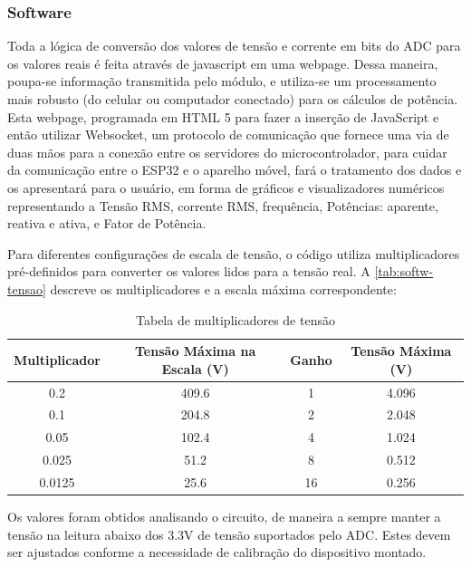 \subsubsection{Software}\label{softwa}

Toda a lógica de conversão dos valores de tensão e corrente em bits do \gls{ADC} para os valores reais é feita através de javascript em uma webpage. Dessa maneira, poupa-se informação transmitida pelo módulo, e utiliza-se um processamento mais robusto (do celular ou computador conectado) para os cálculos de potência.
Esta webpage, programada em HTML 5 para fazer a inserção de JavaScript e então utilizar Websocket, um protocolo de comunicação que fornece uma via de duas mãos para a conexão entre os servidores do microcontrolador, para cuidar da comunicação entre o ESP32 e o aparelho móvel, fará o tratamento dos dados e os apresentará para o usuário, em forma de gráficos e visualizadores numéricos representando a Tensão RMS, corrente RMS, frequência, Potências: aparente, reativa e ativa, e Fator de Potência.

Para diferentes configurações de escala de tensão, o código utiliza multiplicadores pré-definidos para converter os valores lidos para a tensão real. A \autoref{tab:softw-tensao} descreve os multiplicadores e a escala máxima correspondente:

\begin{table}[h!]
    \centering
    \caption{Tabela de multiplicadores de tensão}
    \begin{tabular}{|c|c|c|c|}
        \hline
        \textbf{Multiplicador} & \textbf{Tensão Máxima na Escala (V)} & \textbf{Ganho} & \textbf{Tensão Máxima (V)} \\
        \hline
        0.2 & 409.6 & 1 & 4.096 \\
        0.1 & 204.8 & 2 & 2.048 \\
        0.05 & 102.4 & 4 & 1.024 \\
        0.025 & 51.2 & 8 & 0.512 \\
        0.0125 & 25.6 & 16 & 0.256 \\
        \hline
    \end{tabular}
    \label{tab:softw-tensao}
\end{table}

Os valores foram obtidos analisando o circuito, de maneira a sempre manter a tensão na leitura abaixo dos 3.3V de tensão suportados pelo \gls{ADC}. Estes devem ser ajustados conforme a necessidade de calibração do dispositivo montado.

